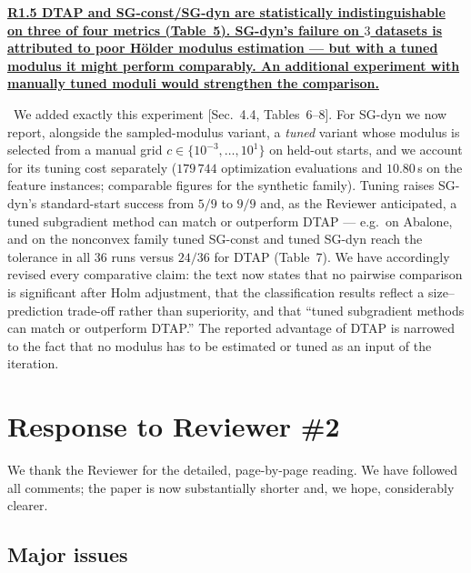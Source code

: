 \documentclass[11pt]{article}
\newcommand{\response}[1]{\smallskip\noindent{\color{blue!60!black}\textbf{Response.}}\ #1\par\medskip}
\newcommand{\loc}[1]{\textcolor{blue!50!black}{[#1]}}
\newenvironment{point}[1]{\medskip\noindent\textbf{\uline{#1}}\par}{\par}
\begin{document}
\begin{point}{R1.5 DTAP and SG-const/SG-dyn are statistically indistinguishable on three
of four metrics (Table~5). SG-dyn's failure on $3$ datasets is attributed to poor
H\"older modulus estimation --- but with a tuned modulus it might perform comparably. An
additional experiment with manually tuned moduli would strengthen the comparison.}
\response{We added exactly this experiment \loc{Sec.~4.4, Tables~6--8}. For SG-dyn we now
report, alongside the sampled-modulus variant, a \emph{tuned} variant whose modulus is
selected from a manual grid $c\in\{10^{-3},\dots,10^{1}\}$ on held-out starts, and we
account for its tuning cost separately ($179\,744$ optimization evaluations and
$10.80$\,s on the feature instances; comparable figures for the synthetic family). Tuning
raises SG-dyn's standard-start success from $5/9$ to $9/9$ and, as the Reviewer
anticipated, a tuned subgradient method can match or outperform DTAP --- e.g.\ on Abalone,
and on the nonconvex family tuned SG-const and tuned SG-dyn reach the tolerance in all
$36$ runs versus $24/36$ for DTAP (Table~7). We have accordingly revised every comparative
claim: the text now states that no pairwise comparison is significant after Holm
adjustment, that the classification results reflect a size--prediction trade-off rather
than superiority, and that ``tuned subgradient methods can match or outperform DTAP.'' The
reported advantage of DTAP is narrowed to the fact that no modulus has to be estimated or
tuned as an input of the iteration.}
\end{point}

\section*{Response to Reviewer \#2}

\noindent We thank the Reviewer for the detailed, page-by-page reading. We have followed
all comments; the paper is now substantially shorter and, we hope, considerably clearer.

\subsection*{Major issues}
\end{document}
